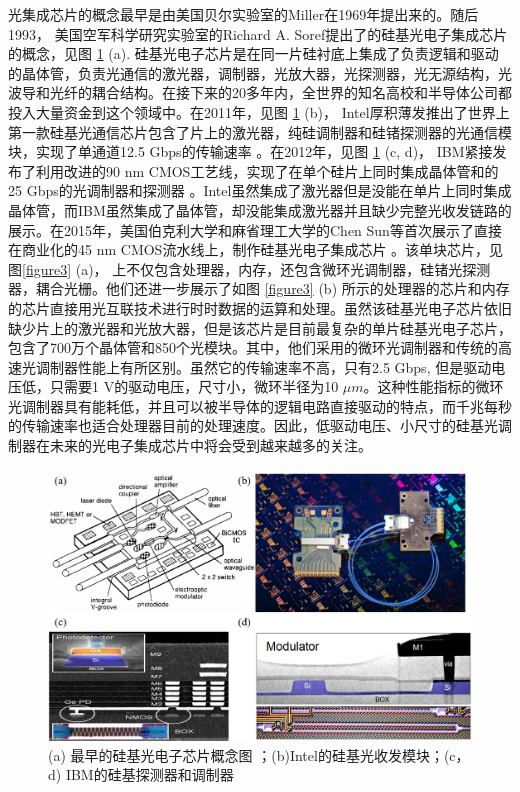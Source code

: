 光集成芯片的概念最早是由美国贝尔实验室的Miller在1969年提出来的\cite{miller1969}。随后1993， 美国空军科学研究实验室的Richard A. Soref提出了的硅基光电子集成芯片的概念\cite{Soref1993}，见图 \ref{figure2} (a). 硅基光电子芯片是在同一片硅衬底上集成了负责逻辑和驱动的晶体管，负责光通信的激光器，调制器，光放大器，光探测器，光无源结构，光波导和光纤的耦合结构。在接下来的20多年内，全世界的知名高校和半导体公司都投入大量资金到这个领域中。在2011年，见图 \ref{figure2} (b)， Intel厚积薄发推出了世界上第一款硅基光通信芯片包含了片上的激光器，纯硅调制器和硅锗探测器的光通信模块，实现了单通道12.5 Gbps的传输速率 \cite{Paniccia2011}。在2012年，见图 \ref{figure2} (c, d)， IBM紧接发布了利用改进的90 nm CMOS工艺线，实现了在单个硅片上同时集成晶体管和的25 Gbps的光调制器和探测器 \cite{Assefa2012}。Intel虽然集成了激光器但是没能在单片上同时集成晶体管，而IBM虽然集成了晶体管，却没能集成激光器并且缺少完整光收发链路的展示。在2015年，美国伯克利大学和麻省理工大学的Chen Sun等首次展示了直接在商业化的45 nm CMOS流水线上，制作硅基光电子集成芯片 \cite{sun2015single}。该单块芯片，见图\ref{figure3} (a)， 上不仅包含处理器，内存，还包含微环光调制器，硅锗光探测器，耦合光栅。他们还进一步展示了如图 \ref{figure3} (b) 所示的处理器的芯片和内存的芯片直接用光互联技术进行时时数据的运算和处理。虽然该硅基光电子芯片依旧缺少片上的激光器和光放大器，但是该芯片是目前最复杂的单片硅基光电子芯片，包含了700万个晶体管和850个光模块。其中，他们采用的微环光调制器和传统的高速光调制器性能上有所区别。虽然它的传输速率不高，只有2.5 Gbps, 但是驱动电压低，只需要1 V的驱动电压，尺寸小，微环半径为10 $\mu m$。这种性能指标的微环光调制器具有能耗低，并且可以被半导体的逻辑电路直接驱动的特点，而千兆每秒的传输速率也适合处理器目前的处理速度。因此，低驱动电压、小尺寸的硅基光调制器在未来的光电子集成芯片中将会受到越来越多的关注。

\begin{figure}[htb]
	\centering
	\includegraphics[width=12cm]{./Pictures/figure2.jpg}
	\caption{ (a) 最早的硅基光电子芯片概念图 \cite{Soref1993}；(b)Intel的硅基光收发模块\cite{Paniccia2011}；(c，d) IBM的硅基探测器和调制器\cite{Assefa2012}}
	\label{figure2}
\end{figure}

